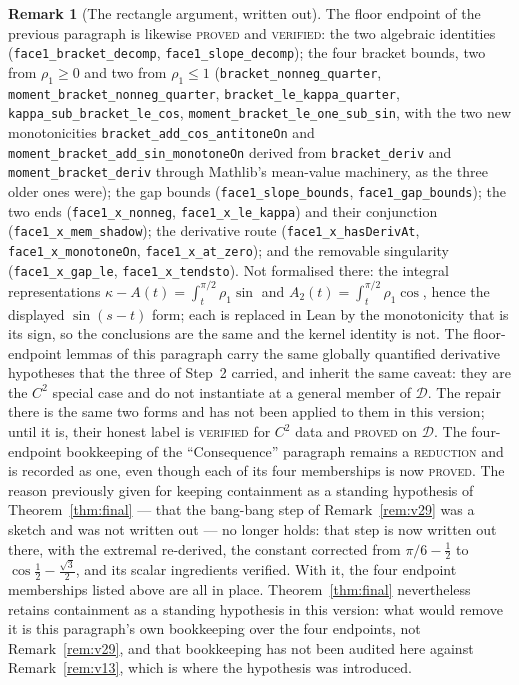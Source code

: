 \documentclass[11pt]{article}
\theoremstyle{definition}
\newtheorem{remark}[theorem]{Remark}
\begin{document}
\begin{remark}[The rectangle argument, written out]
The floor endpoint of the previous
paragraph is likewise \textsc{proved} and \textsc{verified}: the two algebraic identities
(\verb|face1_bracket_decomp|, \verb|face1_slope_decomp|); the four bracket bounds, two from
$\rho_1\ge0$ and two from $\rho_1\le1$ (\verb|bracket_nonneg_quarter|,
\verb|moment_bracket_nonneg_quarter|, \verb|bracket_le_kappa_quarter|,
\verb|kappa_sub_bracket_le_cos|, \verb|moment_bracket_le_one_sub_sin|, with the two new
monotonicities \verb|bracket_add_cos_antitoneOn| and
\verb|moment_bracket_add_sin_monotoneOn| derived from \verb|bracket_deriv| and
\verb|moment_bracket_deriv| through Mathlib's mean-value machinery, as the three older ones
were); the gap bounds (\verb|face1_slope_bounds|, \verb|face1_gap_bounds|); the two ends
(\verb|face1_x_nonneg|, \verb|face1_x_le_kappa|) and their conjunction
(\verb|face1_x_mem_shadow|); the derivative route (\verb|face1_x_hasDerivAt|,
\verb|face1_x_monotoneOn|, \verb|face1_x_at_zero|); and the removable singularity
(\verb|face1_x_gap_le|, \verb|face1_x_tendsto|). Not formalised there: the integral
representations $\kappa-A(t)=\int_t^{\pi/2}\rho_1\sin$ and $A_2(t)=\int_t^{\pi/2}\rho_1\cos$,
hence the displayed $\sin(s-t)$ form; each is replaced in Lean by the monotonicity that is
its sign, so the conclusions are the same and the kernel identity is not. The floor-endpoint
lemmas of this paragraph carry the same globally quantified derivative hypotheses that the
three of Step~2 carried, and inherit the same caveat: they are the $C^2$ special case and do
not instantiate at a general member of $\mathcal D$. The repair there is the same two forms
and has not been applied to them in this version; until it is, their honest label is
\textsc{verified} for $C^2$ data and \textsc{proved} on $\mathcal D$.
The four-endpoint bookkeeping of the ``Consequence'' paragraph remains a
\textsc{reduction} and is recorded as one, even though each of its four memberships is now
\textsc{proved}. The reason previously given
for keeping containment as a standing hypothesis of Theorem~\ref{thm:final} --- that the
bang-bang step of Remark~\ref{rem:v29} was a sketch and was not written out --- no longer
holds: that step is now written out there, with the extremal re-derived, the constant
corrected from $\pi/6-\tfrac12$ to $\cos\tfrac12-\tfrac{\sqrt3}2$, and its scalar ingredients
verified. With it, the four endpoint memberships listed above are all in place.
Theorem~\ref{thm:final} nevertheless retains containment as a standing hypothesis in this
version: what would remove it is this paragraph's own bookkeeping over the four endpoints,
not Remark~\ref{rem:v29}, and that bookkeeping has not been audited here against
Remark~\ref{rem:v13}, which is where the hypothesis was introduced.
\end{remark}
\end{document}

